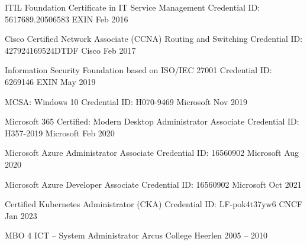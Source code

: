 \documentclass[11pt, a4paper]{awesome-cv}
\begin{document}
\begin{cvhonors}

  \cvhonor
    {ITIL Foundation Certificate in IT Service Management}
    {Credential ID: 5617689.20506583}
    {EXIN}
    {Feb 2016}

  \cvhonor
    {Cisco Certified Network Associate (CCNA) Routing and Switching}
    {Credential ID: 427924169524DTDF}
    {Cisco}
    {Feb 2017}

  \cvhonor
    {Information Security Foundation based on ISO/IEC 27001}
    {Credential ID: 6269146}
    {EXIN}
    {May 2019}

  \cvhonor
    {MCSA: Windows 10}
    {Credential ID: H070-9469}
    {Microsoft}
    {Nov 2019}

  \cvhonor
    {Microsoft 365 Certified: Modern Desktop Administrator Associate}
    {Credential ID: H357-2019}
    {Microsoft}
    {Feb 2020}

  \cvhonor
    {Microsoft Azure Administrator Associate}
    {Credential ID: 16560902}
    {Microsoft}
    {Aug 2020}

  \cvhonor
    {Microsoft Azure Developer Associate}
    {Credential ID: 16560902}
    {Microsoft}
    {Oct 2021}

  \cvhonor
    {Certified Kubernetes Administrator (CKA)}
    {Credential ID: LF-pok4t37yw6}
    {CNCF}
    {Jan 2023}


\end{cvhonors}



\begin{cventries}

  \cventry
    {MBO 4 ICT – System Administrator}
    {Arcus College}
    {Heerlen}
    {2005 -- 2010}
    {
    }


\end{cventries}

\end{document}
